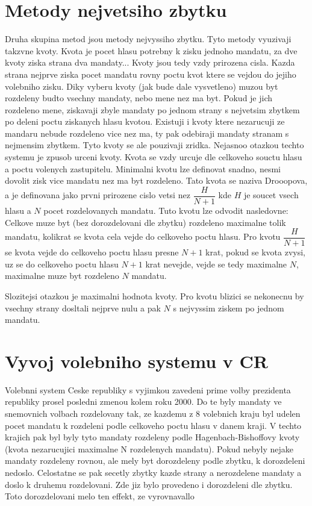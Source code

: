 \documentclass[12pt,a4paper]{article}
\begin{document}
\section{Metody nejvetsiho zbytku}
Druha skupina metod jsou metody nejvyssiho zbytku. Tyto metody vyuzivaji takzvne kvoty. Kvota je pocet hlasu potrebny k zisku jednoho mandatu, za dve kvoty ziska strana dva mandaty... Kvoty jsou tedy vzdy prirozena cisla. Kazda strana nejprve ziska pocet mandatu rovny poctu kvot ktere se vejdou do jejiho volebniho zisku. Diky vyberu kvoty (jak bude dale vysvetleno) muzou byt rozdeleny budto vsechny mandaty, nebo mene nez ma byt. Pokud je jich rozdeleno mene, ziskavaji zbyle mandaty po jednom strany s nejvetsim zbytkem po deleni poctu ziskanych hlasu kvotou. Existuji i kvoty ktere nezarucuji ze mandaru nebude rozdeleno vice nez ma, ty pak odebiraji mandaty stranam s nejmensim zbytkem. Tyto kvoty se ale pouzivaji zridka.
Nejasnoo otazkou techto systemu je zpusob urceni kvoty. Kvota se vzdy urcuje dle celkoveho souctu hlasu a poctu volenych zastupitelu. Minimalni kvotu lze definovat snadno, nesmi dovolit zisk vice mandatu nez ma byt rozdeleno. Tato kvota se naziva Drooopova, a je definovana jako prvni prirozene cislo vetsi nez $\dfrac{H}{N+1}$ kde $H$ je soucet vsech hlasu a $N$ pocet rozdelovanych mandatu. Tuto kvotu lze odvodit nasledovne: Celkove muze byt (bez dorozdelovani dle zbytku) rozdeleno maximalne tolik mandatu, kolikrat se kvota cela vejde do celkoveho poctu hlasu. Pro kvotu $\dfrac{H}{N+1}$ se kvota vejde do celkoveho poctu hlasu presne $N+1$ krat, pokud se kvota zvysi, uz se do celkoveho poctu hlasu $N+1$ krat nevejde, vejde se tedy maximalne $N$, maximalne muze byt rozdeleno $N$ mandatu.

Slozitejsi otazkou je maximalni hodnota kvoty. Pro kvotu blizici se nekonecnu by vsechny strany dosltali nejprve nulu a pak $N$ s nejvyssim ziskem po jednom mandatu.

\section{Vyvoj volebniho systemu v CR}
Volebnni system Ceske republiky s vyjimkou zavedeni prime volby prezidenta republiky prosel posledni zmenou kolem roku 2000. Do te byly mandaty ve snemovnich volbach rozdelovany tak, ze kazdemu z 8 volebnich kraju byl udelen pocet mandatu k rozdeleni podle celkoveho poctu hlasu v danem kraji. V techto krajich pak byl byly tyto mandaty rozdeleny podle Hagenbach-Bishoffovy kvoty (kvota nezarucujici maximalne N rozdelenych mandatu). Pokud nebyly nejake mandaty rozdeleny rovnou, ale mely byt dorozdeleny podle zbytku, k dorozdeleni nedoslo. Celostatne se pak secetly zbytky kazde strany a nerozdelene mandaty a doslo k druhemu rozdelovani. Zde jiz bylo provedeno i dorozdeleni dle zbytku. Toto dorozdelovani melo ten effekt, ze vyrovnavallo %
\end{document}
